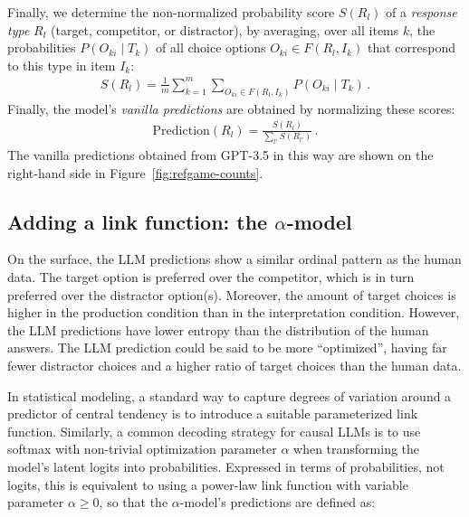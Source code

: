 \documentclass{article}
\begin{document}
Finally, we determine the non-normalized probability score $S(R_{l})$ of a \emph{response type} $R_{l}$ (target, competitor, or distractor), by averaging, over all items $k$, the probabilities $P(O_{ki} \mid T_{k})$ of all choice options $O_{ki} \in F(R_{l}, I_{k})$ that correspond to this type in item $I_{k}$:
%
\begin{align*}
S(R_{l}) = \frac{1}{m} \sum_{k=1}^{m} \sum_{O_{ki} \in F(R_{l}, I_{k})} P(O_{ki} \mid T_k)\,.
\end{align*}
%
Finally, the model's \textit{vanilla predictions} are obtained by normalizing these scores:
%
\begin{align*}
\text{Prediction}(R_{l}) = \frac{S(R_{l})}{\sum_{l'} S(R_{l'})}\,.
\end{align*}
%
The vanilla predictions obtained from GPT-3.5 in this way are shown on the right-hand side in Figure~\ref{fig:refgame-counts}.




\subsection{Adding a link function: the \(\alpha\)-model}
\label{adding-a-link-function-the-alpha-model}



On the surface, the LLM predictions show a similar ordinal pattern as the human data.
The target option is preferred over the competitor, which is in turn preferred over the distractor option(s).
Moreover, the amount of target choices is higher in the production condition than in the interpretation condition.
However, the LLM predictions have lower entropy than the distribution of the human answers.
The LLM prediction could be said to be more ``optimized'', having far fewer distractor choices and a higher ratio of target choices than the human data.

In statistical modeling, a standard way to capture degrees of variation around a predictor of central tendency is to introduce a suitable parameterized link function.
Similarly, a common decoding strategy for causal LLMs is to use softmax with non-trivial optimization parameter $\alpha$ when transforming the model's latent logits into probabilities.
Expressed in terms of probabilities, not logits, this is equivalent to using a power-law link function \citep{WorthyMaddox2008:Ratio-and-Diffe} with variable parameter \(\alpha \ge 0\), so that the $\alpha$-model's predictions are defined as:
\end{document}

